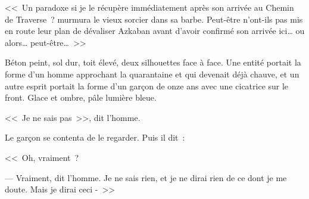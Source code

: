 <<~Un paradoxe si je le récupère immédiatement après son arrivée au Chemin de Traverse~? murmura le vieux sorcier dans sa barbe. Peut-être n'ont-ils pas mis en route leur plan de dévaliser Azkaban avant d'avoir confirmé son arrivée ici… ou alors… peut-être…~>>

\later

Béton peint, sol dur, toit élevé, deux silhouettes face à face. Une entité portait la forme d'un homme approchant la quarantaine et qui devenait déjà chauve, et un autre esprit portait la forme d'un garçon de onze ans avec une cicatrice sur le front. Glace et ombre, pâle lumière bleue.

<<~Je ne sais pas~>>, dit l'homme.

Le garçon se contenta de le regarder. Puis il dit~:

<<~Oh, vraiment~?

--- Vraiment, dit l'homme. Je ne sais rien, et je ne dirai rien de ce dont je me doute. Mais je dirai ceci -~>>
